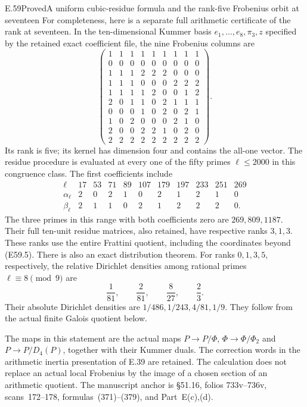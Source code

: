 \begin{statement}{E.59}{Proved}{A uniform cubic-residue formula and the rank-five Frobenius orbit at seventeen}
For completeness, here is a separate full
arithmetic certificate of the rank at seventeen.
In the ten-dimensional Kummer basis
$e_1,\ldots,e_8,\pi_3,z$ specified by the
retained exact coefficient file, the nine
Frobenius columns are
\[
 \begin{pmatrix}
 1&1&1&1&1&1&1&1&1\\
 0&0&0&0&0&0&0&0&0\\
 1&1&1&2&2&2&0&0&0\\
 1&1&1&0&0&0&2&2&2\\
 1&1&1&1&2&0&0&1&2\\
 2&0&1&1&0&2&1&1&1\\
 0&0&0&1&0&2&0&2&1\\
 1&0&2&0&0&0&2&1&0\\
 2&0&0&2&2&1&0&2&0\\
 2&2&2&2&2&2&2&2&2
 \end{pmatrix}.
 \tag{E59.12}
\]
Its rank is five; its kernel has dimension four
and contains the all-one vector.
The residue procedure is evaluated at every
one of the fifty primes $\ell\le2000$ in this
congruence class. The first coefficients include
\[
 \begin{array}{c|rrrrrrrrrr}
 \ell&17&53&71&89&107&179&197&233&251&269\\ \hline
 \alpha_\ell&2&0&2&1&0&2&1&2&1&0\\
 \beta_\ell &2&1&1&0&2&1&2&2&2&0 .
 \end{array}
 \tag{E59.13}
\]
The three primes in this range with both
coefficients zero are $269,809,1187$.
Their full ten-unit residue matrices, also
retained, have respective ranks $3,1,3$.
These ranks use the entire Frattini quotient,
including the coordinates beyond (E59.5).
There is also an exact distribution theorem.
For ranks $0,1,3,5$, respectively, the relative
Dirichlet densities among rational primes
$\ell\equiv8\pmod9$ are
\[
       \frac1{81},\qquad\frac2{81},\qquad
       \frac8{27},\qquad\frac23.
 \tag{E59.13a}
\]
Their absolute Dirichlet densities are
$1/486,1/243,4/81,1/9$.
They follow from the actual finite Galois
quotient below.

The maps in this statement are the actual
maps
$P\to P/\Phi$, $\Phi\to\Phi/\Phi_2$ and
$P\to P/D_4(P)$, together with their Kummer
duals. The correction words in the arithmetic
inertia presentation of E.39 are retained.
The calculation does not replace an actual
local Frobenius by the image of a chosen
section of an arithmetic quotient.
The manuscript anchor is \S51.16, folios
733v--736v, scans~172--178, formulas~(371)--(379),
and Part~E(c),(d).
\end{statement}

